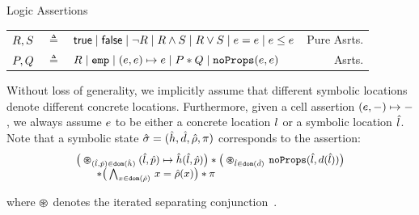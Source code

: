 
\vspace{2pt}
\begin{display}{\jsil Logic Assertions}
%
{\small
\begin{tabular}{r@{\ }c@{\ }lr}
  $R, S$ & $\triangleq$ & ${\sf true} \mid {\sf false} \mid  \neg R \mid R \land S \mid R \lor S \mid e = e \mid e \leq e$ & Pure Asrts. \\
  $P, Q$ & $\triangleq$ & $R \mid \texttt{emp} \mid (e, e)\mapsto e \mid P \mathbin{*} Q \mid \texttt{noProps}(e, e)$ & Asrts.
\end{tabular}}
\end{display}

\noindent Without loss of generality, we implicitly assume that different symbolic locations 
denote different concrete locations. %
 Furthermore, given a cell assertion $(e,-) \mapsto -$, we always assume 
 $e$ to be either a concrete location $l$ or a symbolic location $\hat{l}$. 
%
Note that 
a symbolic state $\hat{\sigma} = (\hat{h}, \hat{d}, \hat\rho, \pi)$ corresponds to the assertion:
\begin{equation*}
{\small \begin{array}{l}
\big(\varoast_{(\sloc, \sexprp) \in \domain(\sheap)} (\sloc, \sexprp) \mapsto \sheap(\sloc, \sexprp)\big) 
  \sep \big(\varoast_{\sloc \in \domain(\sdom)} \, \emptyfields{\sloc}{\idom(\sloc)}\big)  \\
 \qquad \sep \big(\bigwedge_{\jvar \in \domain(\sstore)} \, \jvar = \sstore(\jvar)\big) \sep \pc
\end{array}}
\end{equation*}

\noindent where $\varoast$ denotes the iterated separating conjunction~\cite{reynolds:lics:2002}. 


